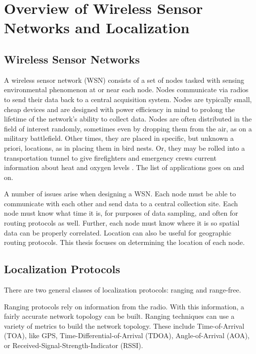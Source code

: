 \chapter{Overview of Wireless Sensor Networks and Localization}
\section{Wireless Sensor Networks}

A wireless sensor network (WSN) consists of a set of nodes tasked with sensing environmental phenomenon at or near each node.  Nodes communicate via radios to send their data back to a central acquisition system.  Nodes are typically small, cheap devices and are designed with power efficiency in mind to prolong the lifetime of the network's ability to collect data.  Nodes are often distributed in the field of interest randomly, sometimes even by dropping them from the air, as on a military battlefield.  Other times, they are placed in specific, but unknown a priori, locations, as in placing them in bird nests\cite{birds}.  Or, they may be rolled into a transportation tunnel to give firefighters and emergency crews current information about heat and oxygen levels \cite{runes}.  The list of applications goes on and on.

A number of issues arise when designing a WSN.  Each node must be able to communicate with each other and send data to a central collection site.  Each node must know what time it is, for purposes of data sampling, and often for routing protocols as well.  Further, each node must know where it is so spatial data can be properly correlated.  Location can also be useful for geographic routing protocols.  This thesis focuses on determining the location of each node.

\section{Localization Protocols}

There are two general classes of localization protocols: ranging and range-free.  

Ranging protocols rely on information from the radio. With this information, a fairly accurate network topology can be built.  Ranging techniques can use a variety of metrics to build the network topology.  These include Time-of-Arrival (TOA), like GPS\cite{Wellenhoff},  Time-Differential-of-Arrival (TDOA)\cite{Savvides}, Angle-of-Arrival (AOA)\cite{APS-AOA}, or Received-Signal-Strength-Indicator (RSSI)\cite{Patwari}.  

